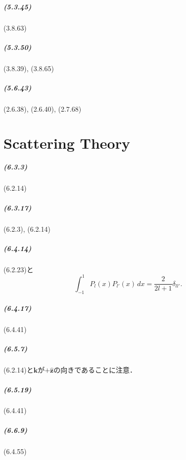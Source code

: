 \documentclass[a4paper]{ltjsreport}
\begin{document}
\paragraph{(5.3.45)}
(3.8.63)

\paragraph{(5.3.50)}
(3.8.39), (3.8.65)

\paragraph{(5.6.43)}
(2.6.38), (2.6.40), (2.7.68)

\chapter{Scattering Theory}
\paragraph{(6.3.3)}
(6.2.14)

\paragraph{(6.3.17)}
(6.2.3), (6.2.14)

\paragraph{(6.4.14)}
(6.2.23)と
\[\int_{-1}^1 P_l(x)P_{l'}(x)\,dx = \frac{2}{2l + 1} \delta_{ll'}.\]

\paragraph{(6.4.17)}
(6.4.41)

\paragraph{(6.5.7)}
(6.2.14)と$\boldsymbol{k}$が$ + \hat{\boldsymbol{z}}$の向きであることに注意．

\paragraph{(6.5.19)}
(6.4.41)

\paragraph{(6.6.9)}
(6.4.55)
\end{document}
